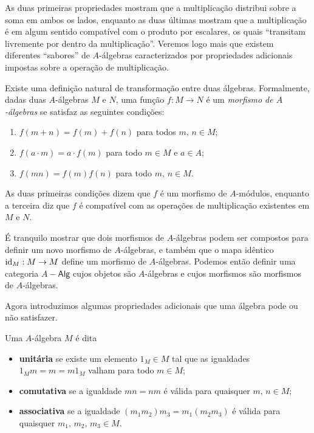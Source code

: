 As duas primeiras propriedades mostram que a multiplicação distribui sobre a soma em ambos os lados, enquanto as duas últimas mostram que a multiplicação é em algum sentido compatível com o produto por escalares, os quais ``transitam livremente por dentro da multiplicação''.
Veremos logo mais que existem diferentes ``sabores'' de $A$-álgebras caracterizados por propriedades adicionais impostas sobre a operação de multiplicação.

Existe uma definição natural de transformação entre duas álgebras.
Formalmente, dadas duas $A$-álgebras $M$ e $N$, uma função $f: M \to N$ é um \emph{morfismo de $A$-álgebras} se satisfaz as seguintes condições:
\begin{enumerate}
\item $f(m+n) = f(m) + f(n)$ para todos $m,\,n \in M$;

\item $f(a \cdot m) = a \cdot f(m)$ para todo $m \in M$ e $a \in A$;

\item $f(mn) = f(m)f(n)$ para todo $m,\,n \in M$.
\end{enumerate}
As duas primeiras condições dizem que $f$ é um morfismo de $A$-módulos, enquanto a terceira diz que $f$ é compatível com as operações de multiplicação existentes em $M$ e $N$.

É tranquilo mostrar que dois morfismos de $A$-álgebras podem ser compostos para definir um novo morfismo de $A$-álgebras, e também que o mapa idêntico $\mathrm{id}_M: M \to M$ define um morfismo de $A$-álgebras.
Podemos então definir uma categoria $A-\mathsf{Alg}$ cujos objetos são $A$-álgebras e cujos morfismos são morfismos de $A$-álgebras.

Agora introduzimos algumas propriedades adicionais que uma álgebra pode ou não satisfazer.
\begin{defin}
  Uma $A$-álgebra $M$ é dita
  \begin{itemize}
  \item \textbf{unitária} se existe um elemento $1_M \in M$ tal que as igualdades $1_Mm = m =m1_M$ valham para todo $m \in M$;
    
  \item \textbf{comutativa} se a igualdade $mn=nm$ é válida para quaisquer $m,\, n \in M$;
    
  \item \textbf{associativa} se a igualdade $(m_1m_2)m_3 = m_1(m_2m_3)$ é válida para quaisquer $m_1,\,m_2,\,m_3 \in M$.
  \end{itemize}
\end{defin}

